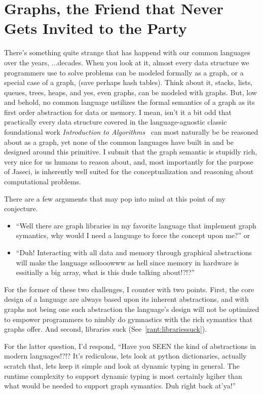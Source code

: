 \documentclass{book}
\begin{document}
\section{Graphs, the Friend that Never Gets Invited to the Party}
There's something quite strange that has happend with our \gls{common languages} over the years, ...decades. When you look at it, almost every data structure we programmers use to solve problems can be modeled formally as a graph, or a special case of a graph, (save perhaps hash tables). Think about it, stacks, lists, queues, trees, heaps, and yes, even graphs, can be modeled with graphs. But, low and behold, no common language ustilizes the formal semantics of a graph as its first order abstraction for data or memory. I mean, isn't it a bit odd that practically every data structure covered in the language-agnostic classic foundational work \textit{Introduction to Algorithms}~\cite{intro_to_algo} can most naturally be be reasoned about as a graph, yet none of the common languages have built in and be designed around this primitive. I submit that the graph semantic is stupidly rich, very nice for us humans to reason about, and, most importantly for the purpose of Jaseci, is inherently well suited for the conceptualization and reasoning about computational problems.
\par
There are a few arguments that may pop into mind at this point of my conjecture.
\begin{itemize}
    \item ``Well there are graph libraries in my favorite language that implement graph symantics, why would I need a language to force the concept upon me?''
          or
    \item ``Duh! Interacting with all data and memory through graphical abstractions will make the language ssllooowww as hell since memory in hardware is essitially a big array, what is this dude talking about!?!?''
\end{itemize}
\par
For the former of these two challenges, I counter with two points. First, the core design of a language are always based upon its inherent abstractions, and with graphs not being one such abstraction the language's design will not be optimized to empower programmers to nimbly do gymnastics with the rich symantics that graphs offer. And second, libraries suck (See~\ref{rant:librariessuck}).
\par
For the latter question, I'd respond, ``Have you SEEN the kind of abstractions in modern languages!?!? It's rediculous, lets look at python dictionaries, actually scratch that, lets keep it simple and look at dynamic typing in general. The runtime complexity to support dynamic typing is most certainly hgiher than what would be needed to support graph symantics. Duh right back at'ya!''
\end{document}
